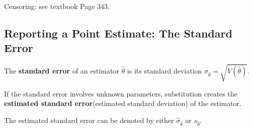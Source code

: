 \begin{proposition}
    Censoring: see textbook Page 343.
\end{proposition}

\subsection{Reporting a Point Estimate: The Standard Error}

\begin{definition}
    The \textbf{standard error} of an estimator $\hat{\theta}$ is its standard deviation $\sigma_{\hat{\theta}}=\sqrt{V(\hat{\theta})}$. 

    If the standard error involves unknown parameters, substitution creates the \textbf{estimated standard error}(estimated standard deviation) of the estimator. 

    The estimated standard error can be denoted by either $\hat{\sigma}_{\hat{\theta}}$ or $s_{\hat{\theta}}$.
\end{definition}

